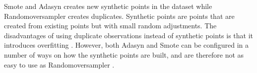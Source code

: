 Smote and Adasyn creates new synthetic points in the dataset while Randomoversampler creates duplicates. Synthetic points are points that are created from existing points but with small random adjustments. The disadvantages of using duplicate observations instead of synthetic points is that it introduces overfitting \cite{BOOK:12}. However, both Adasyn and Smote can be configured in a number of ways on how the synthetic points are built, and are therefore not as easy to use as Randomoversampler \cite{WEBSITE:23}. 






